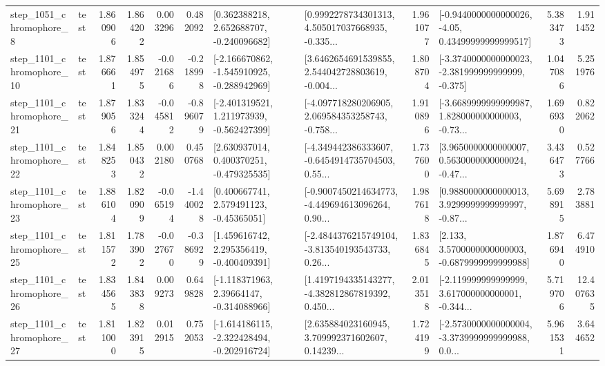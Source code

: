 \begin{tabular}{llrrrrllrlrr}
  step\_1051\_chromophore\_8 &      test &      1.860906 &    1.864202 &      0.003296 &  0.482092 &    [0.362388218, 2.652688707, -0.240096682] &  [0.9992278734301313, 4.505017037668935, -0.335... &       1.961077 &  [-0.9440000000000026, -4.05, 0.43499999999999517] &            5.383473 &          1.911452 \\
 step\_1101\_chromophore\_10 &      test &      1.876661 &    1.854975 &     -0.021686 & -0.218998 &  [-2.166670862, -1.545910925, -0.288942969] &  [3.6462654691539855, 2.544042728803619, -0.004... &       1.808704 &  [-3.3740000000000023, -2.381999999999999, -0.375] &            1.047086 &          5.251976 \\
 step\_1101\_chromophore\_21 &      test &      1.879056 &    1.833244 &     -0.045812 & -0.896079 &   [-2.401319521, 1.211973939, -0.562427399] &  [-4.097718280206905, 2.069584353258743, -0.758... &       1.910896 &  [-3.6689999999999987, 1.828000000000003, -0.73... &            1.696930 &          0.822062 \\
 step\_1101\_chromophore\_22 &      test &      1.848253 &    1.850432 &      0.002180 &  0.450768 &    [2.630937014, 0.400370251, -0.479325535] &  [-4.349442386333607, -0.6454914735704503, 0.55... &       1.737600 &  [3.9650000000000007, 0.5630000000000024, -0.47... &            3.436473 &          0.527766 \\
 step\_1101\_chromophore\_23 &      test &      1.886104 &    1.820909 &     -0.065194 & -1.440028 &     [0.400667741, 2.579491123, -0.45365051] &  [-0.9007450214634773, -4.449694613096264, 0.90... &       1.987618 &  [0.9880000000000013, 3.9299999999999997, -0.87... &            5.698915 &          2.783881 \\
 step\_1101\_chromophore\_25 &      test &      1.811572 &    1.783902 &     -0.027670 & -0.386929 &    [1.459616742, 2.295356419, -0.400409391] &  [-2.4844376215749104, -3.813540193543733, 0.26... &       1.836845 &   [2.133, 3.5700000000000003, -0.6879999999999988] &            1.876940 &          6.474910 \\
 step\_1101\_chromophore\_26 &      test &      1.834565 &    1.843838 &      0.009273 &  0.649828 &    [-1.118371963, 2.39664147, -0.314088966] &  [1.4197194335143277, -4.382812867819392, 0.450... &       2.013518 &  [-2.119999999999999, 3.617000000000001, -0.344... &            5.719706 &         12.407635 \\
 step\_1101\_chromophore\_27 &      test &      1.811000 &    1.823915 &      0.012915 &  0.752053 &  [-1.614186115, -2.322428494, -0.202916724] &  [2.635884023160945, 3.709992371602607, 0.14239... &       1.724199 &  [-2.5730000000000004, -3.3739999999999988, 0.0... &            5.961531 &          3.644652 \\

\end{tabular}

